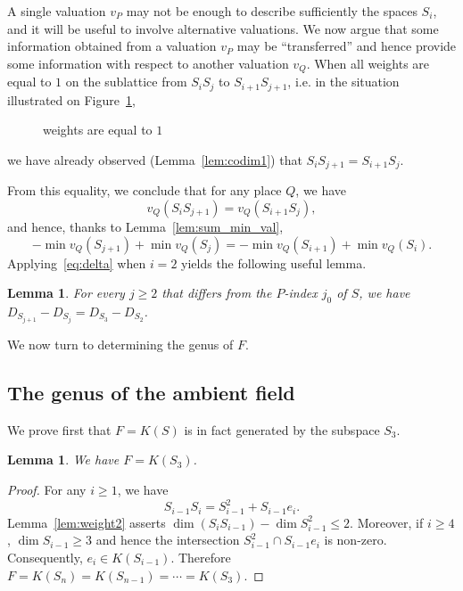 \documentclass[10pt]{amsart}
\newtheorem{lemm}[theo]{Lemma}
\theoremstyle{definition}
\theoremstyle{remark}
\renewcommand{\geq}{\geqslant}
\renewcommand{\leq}{\leqslant}
\begin{document}
A single valuation $v_P$ may not be enough to describe sufficiently the spaces $S_i$, and it will be useful to involve alternative valuations. We now argue that some information obtained from a valuation $v_P$ may be ``transferred'' and hence provide some information with respect to another valuation $v_Q$. When all weights are equal to $1$ on the sublattice from $S_iS_j$ to $S_{i+1}S_{j+1}$, i.e. in the situation illustrated on Figure~\ref{fig:square},
\begin{figure}[h]
\centering
{}
\caption{weights are equal to $1$}\label{fig:square}
\end{figure}
we have already observed (Lemma~\ref{lem:codim1}) that $S_{i}S_{j+1}=S_{i+1}S_{j}$.

From this equality, we conclude that for any place $Q$, we have
\[
v_Q(S_{i}S_{j+1})=v_Q(S_{i+1}S_{j}),
\]
and hence, thanks to Lemma~\ref{lem:sum_min_val},
\begin{equation}\label{eq:delta}
-\min v_Q(S_{j+1})+\min v_Q(S_j)=-\min v_Q(S_{i+1})+\min v_Q(S_i).
\end{equation}
Applying~\eqref{eq:delta} when $i=2$ yields the following useful lemma.

\begin{lemm}\label{lem:D_Si}
For every $j\geq2$ that differs from the $P$-index $j_0$ of $S$, we have $D_{S_{j+1}}-D_{S_j}=D_{S_3}-D_{S_2}$.
\end{lemm}

We now turn to determining the genus of $F$.

\subsection{The genus of the ambient field}\label{sec:genus}

We prove first that $F=K(S)$ is in fact generated by the subspace $S_3$.

\begin{lemm}\label{lem:dimSiSi+1}
We have $F= K(S_3)$.
\end{lemm}

\begin{proof}
For any $i\geq1$, we have
\[
S_{i-1} S_i= S_{i-1}^2 + S_{i-1} e_i.
\]
Lemma~\ref{lem:weight2} asserts $\dim (S_iS_{i-1}) - \dim S_{i-1}^2\leq2$. Moreover, if $i\geq4$, $\dim S_{i-1}\geq3$ and hence the intersection $S_{i-1}^2 \cap S_{i-1}e_i$ is non-zero. Consequently, $e_i \in K(S_{i-1})$. Therefore $F=K(S_n)=K(S_{n-1})=\cdots=K(S_3)$.
\end{proof}
\end{document}
